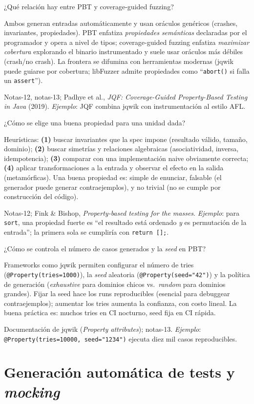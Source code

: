 \documentclass[11pt,a4paper]{article}
\newcounter{preg}
\newcommand{\qa}[3]{%
  \stepcounter{preg}%
  \vspace{0.4em}
  \begin{preguntabox}{\thepreg}
  #1
  \end{preguntabox}
  \begin{respuestabox}
  #2
  \end{respuestabox}
  \begin{refbox}
  #3
  \end{refbox}
  \vspace{0.6em}
}
\begin{document}
\qa{¿Qué relación hay entre PBT y coverage-guided fuzzing?}
{Ambos generan entradas automáticamente y usan oráculos genéricos (crashes, invariantes, propiedades). PBT enfatiza \emph{propiedades semánticas} declaradas por el programador y opera a nivel de tipos; coverage-guided fuzzing enfatiza \emph{maximizar cobertura} explorando el binario instrumentado y suele usar oráculos más débiles (crash/no crash). La frontera se difumina con herramientas modernas (jqwik puede guiarse por cobertura; libFuzzer admite propiedades como ``\texttt{abort()} si falla un \texttt{assert}'').}
{Notas-12, notas-13; Padhye et al., \emph{JQF: Coverage-Guided Property-Based Testing in Java} (2019). \emph{Ejemplo}: JQF combina jqwik con instrumentación al estilo AFL.}

\qa{¿Cómo se elige una buena propiedad para una unidad dada?}
{Heurísticas: \textbf{(1)} buscar invariantes que la spec impone (resultado válido, tamaño, dominio); \textbf{(2)} buscar simetrías y relaciones algebraicas (asociatividad, inversa, idempotencia); \textbf{(3)} comparar con una implementación naive obviamente correcta; \textbf{(4)} aplicar transformaciones a la entrada y observar el efecto en la salida (metamórficas). Una buena propiedad es: simple de enunciar, falsable (el generador puede generar contraejemplos), y no trivial (no se cumple por construcción del código).}
{Notas-12; Fink \& Bishop, \emph{Property-based testing for the masses}. \emph{Ejemplo}: para \texttt{sort}, una propiedad fuerte es ``el resultado está ordenado \emph{y} es permutación de la entrada''; la primera sola se cumpliría con \texttt{return [];}.}

\qa{¿Cómo se controla el número de casos generados y la \emph{seed} en PBT?}
{Frameworks como jqwik permiten configurar el número de tries (\texttt{@Property(tries=1000)}), la \emph{seed} aleatoria (\texttt{@Property(seed="42")}) y la política de generación (\emph{exhaustive} para dominios chicos vs.\ \emph{random} para dominios grandes). Fijar la seed hace los runs reproducibles (esencial para debuggear contraejemplos); aumentar los tries aumenta la confianza, con costo lineal. La buena práctica es: muchos tries en CI nocturno, seed fija en CI rápida.}
{Documentación de jqwik (\emph{Property attributes}); notas-13. \emph{Ejemplo}: \texttt{@Property(tries=10000, seed="1234")} ejecuta diez mil casos reproducibles.}

\section{Generación automática de tests y \emph{mocking}}
\end{document}
